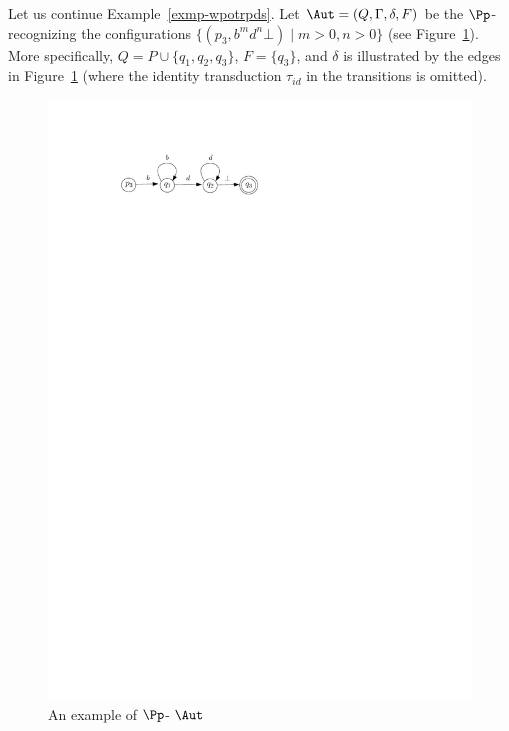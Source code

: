 \begin{example}
Let us continue Example~\ref{exmp-wpotrpds}. Let $\Aut = (Q, \Gamma, \delta, F)$ be the $\Pp$-{\NFA} recognizing the configurations $\{(p_3, b^m d^n \bot) \mid m > 0, n > 0\}$ (see Figure~\ref{fig-pnfa-exmp}). More specifically, $Q= P \cup \{q_1, q_2, q_3\}$, $F= \{q_3\}$, and $\delta$ is illustrated by the edges in Figure~\ref{fig-pnfa-exmp} (where the identity transduction $\tau_{id}$ in the transitions is omitted).  
%
\begin{figure}[htb]
    \centering
	\includegraphics[scale = 0.9]{pnfa-example.pdf}
	\caption{An example of $\Pp$-{\NFA} $\Aut$}\label{fig-pnfa-exmp}
\end{figure}


\end{example}

